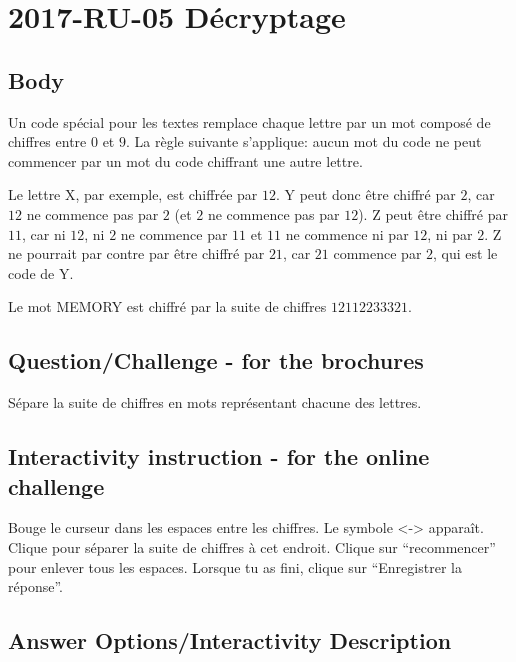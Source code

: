 \documentclass[a4paper,11pt]{report}
\newcommand{\BrochureInlineCode}[1]{{\ttfamily #1}}
\begin{document}
\section*{\centering{} 2017-RU-05 Décryptage}


\subsection*{Body}

Un code spécial pour les textes remplace chaque lettre par un mot composé de chiffres entre $0$ et $9$. La règle suivante s’applique: aucun mot du code ne peut commencer par un mot du code chiffrant une autre lettre.

Le lettre \BrochureInlineCode{X}, par exemple, est chiffrée par $12$. \BrochureInlineCode{Y} peut donc être chiffré par $2$, car $12$ ne commence pas par $2$ (et $2$ ne commence pas par $12$). \BrochureInlineCode{Z} peut être chiffré par $11$, car ni $12$, ni $2$ ne commence par $11$ et $11$ ne commence ni par $12$, ni par $2$. \BrochureInlineCode{Z} ne pourrait par contre par être chiffré par $21$, car $21$ commence par $2$, qui est le code de \BrochureInlineCode{Y}.

Le mot \BrochureInlineCode{MEMORY} est chiffré par la suite de chiffres $12112233321$.

{\em


\subsection*{Question/Challenge - for the brochures}

Sépare la suite de chiffres en mots représentant chacune des lettres.

}


\subsection*{Interactivity instruction - for the online challenge}

Bouge le curseur dans les espaces entre les chiffres. Le symbole <-> apparaît. Clique pour séparer la suite de chiffres à cet endroit. Clique sur “recommencer” pour enlever tous les espaces. Lorsque tu as fini, clique sur “Enregistrer la réponse”.

\begingroup
\renewcommand{\arraystretch}{1.5}
\subsection*{Answer Options/Interactivity Description}
\end{document}

